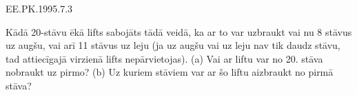 
EE.PK.1995.7.3

Kādā 20-stāvu ēkā lifts sabojāts tādā veidā, ka ar to var 
uzbraukt vai nu 8 stāvus uz augšu, vai arī 11 stāvus uz leju
(ja uz augšu vai uz leju nav tik daudz stāvu, tad attiecīgajā virzienā 
lifts nepārvietojas). 
(a) Vai ar liftu var no 20. stāva nobraukt uz pirmo?
(b) Uz kuriem stāviem var ar šo liftu aizbraukt no pirmā stāva?



